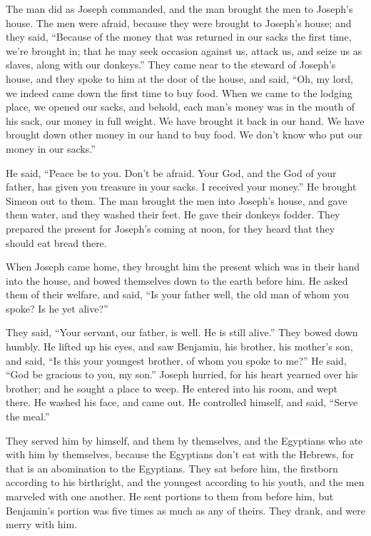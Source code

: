 {\par }{\PP {}The man did as Joseph commanded, and the man brought the men to Joseph’s house.
The men were afraid, because they were brought to Joseph’s house; and they said, “Because of the money that was returned in our sacks the first time, we’re brought in; that he may seek occasion against us, attack us, and seize us as slaves, along with our donkeys.”
They came near to the steward of Joseph’s house, and they spoke to him at the door of the house,
and said, “Oh, my lord, we indeed came down the first time to buy food.
When we came to the lodging place, we opened our sacks, and behold, each man’s money was in the mouth of his sack, our money in full weight. We have brought it back in our hand.
We have brought down other money in our hand to buy food. We don’t know who put our money in our sacks.”
\par }{\PP {}He said, “Peace be to you. Don’t be afraid. Your God, and the God of your father, has given you treasure in your sacks. I received your money.” He brought Simeon out to them.
The man brought the men into Joseph’s house, and gave them water, and they washed their feet. He gave their donkeys fodder.
They prepared the present for Joseph’s coming at noon, for they heard that they should eat bread there.
\par }{\PP {}When Joseph came home, they brought him the present which was in their hand into the house, and bowed themselves down to the earth before him.
He asked them of their welfare, and said, “Is your father well, the old man of whom you spoke? Is he yet alive?”
\par }{\PP {}They said, “Your servant, our father, is well. He is still alive.” They bowed down humbly.
He lifted up his eyes, and saw Benjamin, his brother, his mother’s son, and said, “Is this your youngest brother, of whom you spoke to me?” He said, “God be gracious to you, my son.”
Joseph hurried, for his heart yearned over his brother; and he sought a place to weep. He entered into his room, and wept there.
He washed his face, and came out. He controlled himself, and said, “Serve the meal.”
\par }{\PP {}They served him by himself, and them by themselves, and the Egyptians who ate with him by themselves, because the Egyptians don’t eat with the Hebrews, for that is an abomination to the Egyptians.
They sat before him, the firstborn according to his birthright, and the youngest according to his youth, and the men marveled with one another.
He sent portions to them from before him, but Benjamin’s portion was five times as much as any of theirs. They drank, and were merry with him.

}
